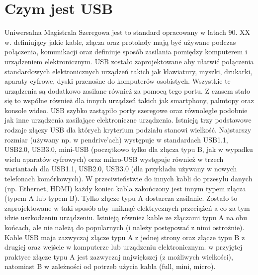 \documentclass{BscUS}
\begin{document}
\chapter{Czym jest USB}
\label{USBStandardChapter}
Uniwersalna Magistrala Szeregowa jest to standard opracowany w latach 90. XX w. definiujący jakie kable, złącza oraz protokoły mają być używane podczas połączenia, komunikacji oraz definiuje sposób zasilania pomiędzy komputerem i urządzeniem elektronicznym. USB zostało zaprojektowane aby ułatwić połączenia standardowych elektronicznych urządzeń takich jak klawiatury, myszki, drukarki, aparaty cyfrowe, dyski przenośne do komputerów osobistych. Wszystkie te urządzenia są dodatkowo zasilane również za pomocą tego portu. Z czasem stało się to wspólne również dla innych urządzeń takich jak smartphony, palmtopy oraz konsole wideo.\cite{USBSystemArch, USB20Doc, USB30Doc}
\newline
\indent USB szybko zastąpiło porty szeregowe oraz równoległe podobnie jak inne urządzenia zasilające elektroniczne urządzenia.
\indent Istnieją trzy podstawowe rodzaje złączy USB dla których kryterium podziału stanowi wielkość. Najstarszy rozmiar (używany np. w pendrive'ach) występuje w standardach USB1.1, USB2.0, USB3.0, mini-USB (początkowo tylko dla złącza typu B, jak w wypadku wielu aparatów cyfrowych) oraz mikro-USB występuje również w trzech wariantach dla USB1.1, USB2.0, USB3.0 (dla przykładu używany w nowych telefonach komórkowych). 
\newline
\indent W przeciwieństwie do innych kabli do przesyłu danych (np. Ethernet, HDMI) każdy koniec kabla zakończony jest innym typem złącza (typem A lub typem B). Tylko złącze typu A dostarcza zasilanie. Zostało to zaprojektowane w taki sposób aby uniknąć elektrycznych przeciążeń a co za tym idzie uszkodzeniu urządzeniu. Istnieją również kable ze złączami typu A na obu końcach, ale nie należą do popularnych (i należy postępować z nimi ostrożnie). Kable USB maja zazwyczaj złącze typu A z jednej strony oraz złącze typu B z drugiej oraz wejście w komputerze lub urządzeniu elektronicznym. w przyjętej praktyce złącze typu A jest zazwyczaj największej (z możliwych wielkości), natomiast B w zależności od potrzeb użycia kabla (full, mini, micro). \cite{USBSystemArch, USB20Doc, USB30Doc}
\end{document}
